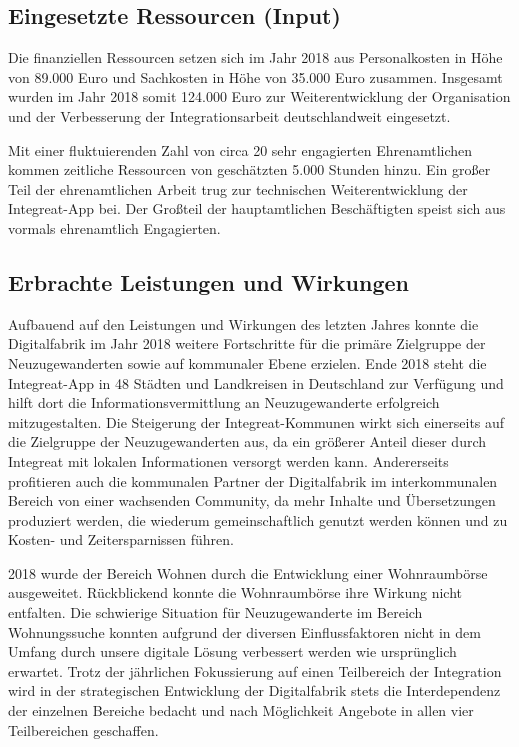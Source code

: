 \documentclass[12pt, a4paper]{article} %
\begin{document}
\hypertarget{eingesetzte-ressourcen-input}{%
\subsection{Eingesetzte Ressourcen (Input)
}\label{eingesetzte-ressourcen-input}}

Die finanziellen Ressourcen setzen sich im Jahr 2018 aus Personalkosten
in Höhe von 89.000 Euro und Sachkosten in Höhe von 35.000 Euro zusammen.
Insgesamt wurden im Jahr 2018 somit 124.000 Euro zur Weiterentwicklung
der Organisation und der Verbesserung der Integrationsarbeit
deutschlandweit eingesetzt.

Mit einer fluktuierenden Zahl von circa 20 sehr engagierten
Ehrenamtlichen kommen zeitliche Ressourcen von geschätzten 5.000 Stunden
hinzu. Ein großer Teil der ehrenamtlichen Arbeit trug zur technischen
Weiterentwicklung der Integreat-App bei. Der Großteil der hauptamtlichen
Beschäftigten speist sich aus vormals ehrenamtlich Engagierten.

\hypertarget{erbrachte-leistungen-und-wirkungen}{%
\subsection{Erbrachte Leistungen und
Wirkungen}\label{erbrachte-leistungen-und-wirkungen}}

Aufbauend auf den Leistungen und Wirkungen des letzten Jahres konnte die
Digitalfabrik im Jahr 2018 weitere Fortschritte für die primäre
Zielgruppe der Neuzugewanderten sowie auf kommunaler Ebene erzielen.
Ende 2018 steht die Integreat-App in 48 Städten und Landkreisen in
Deutschland zur Verfügung und hilft dort die Informationsvermittlung an
Neuzugewanderte erfolgreich mitzugestalten. Die Steigerung der
Integreat-Kommunen wirkt sich einerseits auf die Zielgruppe der
Neuzugewanderten aus, da ein größerer Anteil dieser durch Integreat mit
lokalen Informationen versorgt werden kann. Andererseits profitieren
auch die kommunalen Partner der Digitalfabrik im interkommunalen Bereich
von einer wachsenden Community, da mehr Inhalte und Übersetzungen
produziert werden, die wiederum gemeinschaftlich genutzt werden können
und zu Kosten- und Zeitersparnissen führen.

2018 wurde der Bereich Wohnen durch die Entwicklung einer Wohnraumbörse
ausgeweitet. Rückblickend konnte die Wohnraumbörse ihre Wirkung nicht
entfalten. Die schwierige Situation für Neuzugewanderte im Bereich
Wohnungssuche konnten aufgrund der diversen Einflussfaktoren nicht in
dem Umfang durch unsere digitale Lösung verbessert werden wie
ursprünglich erwartet. Trotz der jährlichen Fokussierung auf einen
Teilbereich der Integration wird in der strategischen Entwicklung der
Digitalfabrik stets die Interdependenz der einzelnen Bereiche bedacht
und nach Möglichkeit Angebote in allen vier Teilbereichen geschaffen.
\end{document}
